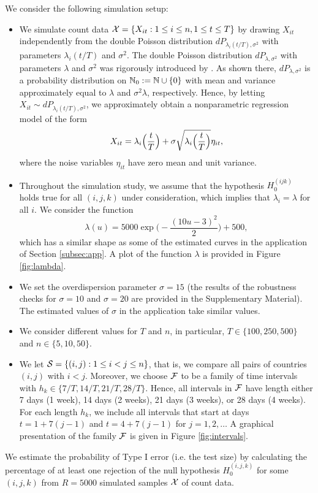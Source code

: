 \documentclass[a4paper,12pt]{article}
\numberwithin{equation}{section}
\begin{document}
We consider the following simulation setup: 
\begin{itemize}[leftmargin=0.45cm]

\item We simulate count data $\mathcal{X} = \{ X_{it}: 1 \le i \le n, 1 \le t \le T \}$ by drawing $X_{it}$ independently from the double Poisson distribution $dP_{\lambda_i(t/T),\sigma^2}$ with parameters $\lambda_i(t/T)$ and $\sigma^2$. The double Poisson distribution $dP_{\lambda,\sigma^2}$ with parameters $\lambda$ and $\sigma^2$ was rigorously introduced by \cite{Efron1986}. As shown there, $dP_{\lambda,\sigma^2}$ is a probability distribution on $\mathbb{N}_0 := \mathbb{N} \cup \{ 0 \}$ with mean and variance approximately equal to $\lambda$ and $\sigma^2 \lambda$, respectively. Hence, by letting $X_{it} \sim dP_{\lambda_i(t/T),\sigma^2}$, we approximately obtain a nonparametric regression model of the form 
\[ X_{it} = \lambda_i\Big(\frac{t}{T}\Big) + \sigma \sqrt{\lambda_i\Big(\frac{t}{T}\Big)} \eta_{it}, \]
where the noise variables $\eta_{it}$ have zero mean and unit variance.

\item Throughout the simulation study, we assume that the hypothesis $H_0^{(ijk)}$ holds true for all $(i,j,k)$ under consideration, which implies that $\lambda_i = \lambda$ for all $i$. We consider the function 
\[ \lambda(u) = 5000 \exp\Big(-\frac{(10 u-3)^2}{2}\Big) + 500, \]
which has a similar shape as some of the estimated curves in the application of Section \ref{subsec:app}. A plot of the function $\lambda$ is provided in Figure \ref{fig:lambda}. 

\item We set the overdispersion parameter $\sigma = 15$ (the results of the robustness checks for $\sigma=10$ and $\sigma=20$ are provided in the Supplementary Material). The estimated values of $\sigma$ in the application take similar values.

\item We consider different values for $T$ and $n$, in particular, $T \in \{100,250, 500\}$ and $n \in \{5,10,50\}$. 

\item We let $\mathcal{S} = \{ (i,j): 1 \le i < j \le n\}$, that is, we compare all pairs of countries $(i,j)$ with $i < j$. Moreover, we choose $\mathcal{F}$ to be a family of time intervals with $h_k \in \{ 7/T,14/T,21/T,28/T \}$. Hence, all intervals in $\mathcal{F}$ have length either 7 days (1 week), 14 days (2 weeks), 21 days (3 weeks), or 28 days (4 weeks). For each length $h_k$, we include all intervals that start at days $t = 1 + 7(j-1)$ and $t = 4 + 7(j-1)$ for $j=1,2,\ldots$ A graphical presentation of the family $\mathcal{F}$ is given in Figure \ref{fig:intervals}. 

\end{itemize}
We estimate the probability of Type I error (i.e. the test size) by calculating the percentage of at least one rejection of the null hypothesis $H_0^{(i, j, k)}$ for some $(i, j, k)$ from $R=5 000$ simulated samples $\mathcal{X}$ of count data.
\end{document}
